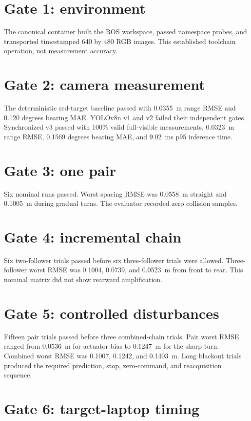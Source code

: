 \documentclass[11pt,oneside,openany]{book}
\begin{document}
\section{Gate 1: environment}

The canonical container built the ROS workspace, passed namespace probes, and transported timestamped 640 by 480 RGB images. This established toolchain operation, not measurement accuracy.

\section{Gate 2: camera measurement}

The deterministic red-target baseline passed with 0.0355~m range RMSE and 0.120 degrees bearing MAE. YOLOv8n v1 and v2 failed their independent gates. Synchronized v3 passed with 100\% valid full-visible measurements, 0.0323~m range RMSE, 0.1569 degrees bearing MAE, and 9.02~ms p95 inference time.

\section{Gate 3: one pair}

Six nominal runs passed. Worst spacing RMSE was 0.0558~m straight and 0.1005~m during gradual turns. The evaluator recorded zero collision samples.

\section{Gate 4: incremental chain}

Six two-follower trials passed before six three-follower trials were allowed. Three-follower worst RMSE was 0.1004, 0.0739, and 0.0523~m from front to rear. This nominal matrix did not show rearward amplification.

\section{Gate 5: controlled disturbances}

Fifteen pair trials passed before three combined-chain trials. Pair worst RMSE ranged from 0.0536~m for actuator bias to 0.1247~m for the sharp turn. Combined worst RMSE was 0.1007, 0.1242, and 0.1403~m. Long blackout trials produced the required prediction, stop, zero-command, and reacquisition sequence.

\section{Gate 6: target-laptop timing}
\end{document}
